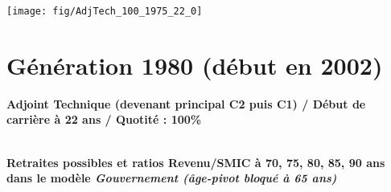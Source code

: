 \vspace{0.1cm} 

 {\hspace{-2.2cm}\texttt{[image: fig/AdjTech\_100\_1975\_22\_0]}} 

\newpage 
 
\section{Génération 1980 (début en 2002)\label{AdjTech_100_1980_22_0}} 
 
{\bf \noindent Adjoint Technique (devenant principal C2 puis C1) / Début de carrière à 22 ans / Quotité : 100\%}  ~ 

 ~\\{\bf \noindent Retraites possibles et ratios Revenu/SMIC à 70, 75, 80, 85, 90 ans dans le modèle \emph{Gouvernement (âge-pivot bloqué à 65 ans)}}  
 
